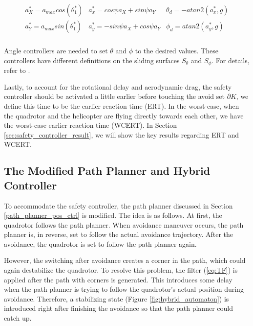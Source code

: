 \documentclass[journal,11pt,onecolumn,draftclsnofoot,]{IEEEtran}
\begin{document}
\begin{equation}
\label{eq:u_conversion}
\begin{split}
\begin{matrix}
a_X^* = a_{max}cos(\theta_1^*) & a_x^* = cos\psi a_X + sin\psi a_Y & \theta_d = -atan2(a_x^*,g) \\
a_Y^* = a_{max}sin(\theta_1^*) & a_y^* = -sin\psi a_X + cos\psi a_Y & \phi_d = atan2(a_y^*,g) \\
\end{matrix}
\end{split}
\end{equation}

Angle controllers are needed to set $\theta$ and $\phi$ to the desired values. These controllers have different definitions on the sliding surfaces $S_{\theta}$ and $S_{\phi}$. For details, refer to \cite{bouadi2007sliding}.

Lastly, to account for the rotational delay and aerodynamic drag, the safety controller should be activated a little earlier before touching the avoid set $\partial K$, we define this time to be the earlier reaction time (ERT). In the worst-case, when the quadrotor and the helicopter are flying directly towards each other, we have the worst-case earlier reaction time (WCERT). In Section \ref{sec:safety_controller_result}, we will show the key results regarding ERT and WCERT.

\subsection{\textbf{The Modified Path Planner and Hybrid Controller}}

To accommodate the safety controller, the path planner discussed in Section \ref{path_planner_pos_ctrl} is modified. The idea is as follows. At first, the quadrotor follows the path planner. When avoidance maneuver occurs, the path planner is, in reverse, set to follow the actual avoidance trajectory. After the avoidance, the quadrotor is set to follow the path planner again. 

However, the switching after avoidance creates a corner in the path, which could again destabilize the quadrotor. To resolve this problem, the filter (\ref{eq:TF}) is applied after the path with corners is generated. This introduces some delay when the path planner is trying to follow the quadrotor's actual position during avoidance. Therefore, a stabilizing state (Figure \ref{fig:hybrid_automaton}) is introduced right after finishing the avoidance so that the path planner could catch up. 
\end{document}
